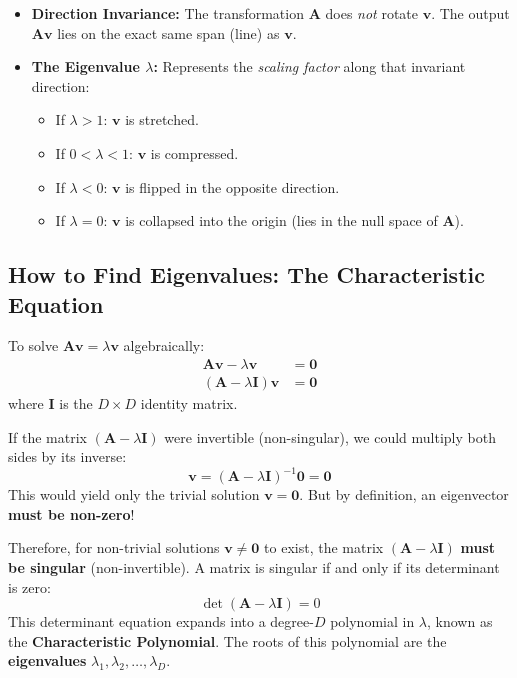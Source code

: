 \documentclass[11pt, a4paper]{article}
\begin{document}
\begin{explainbox}
\begin{itemize}[leftmargin=1.2em]
    \item \textbf{Direction Invariance:} The transformation $\mathbf{A}$ does \emph{not} rotate $\mathbf{v}$. The output $\mathbf{A}\mathbf{v}$ lies on the exact same span (line) as $\mathbf{v}$.
    \item \textbf{The Eigenvalue $\lambda$:} Represents the \emph{scaling factor} along that invariant direction:
    \begin{itemize}
        \item If $\lambda > 1$: $\mathbf{v}$ is stretched.
        \item If $0 < \lambda < 1$: $\mathbf{v}$ is compressed.
        \item If $\lambda < 0$: $\mathbf{v}$ is flipped in the opposite direction.
        \item If $\lambda = 0$: $\mathbf{v}$ is collapsed into the origin (lies in the null space of $\mathbf{A}$).
    \end{itemize}
\end{itemize}
\end{explainbox}

\subsection{How to Find Eigenvalues: The Characteristic Equation}

To solve $\mathbf{A}\mathbf{v} = \lambda \mathbf{v}$ algebraically:
\begin{align}
\mathbf{A}\mathbf{v} - \lambda \mathbf{v} &= \mathbf{0} \\[0.3em]
(\mathbf{A} - \lambda \mathbf{I})\mathbf{v} &= \mathbf{0}
\end{align}
where $\mathbf{I}$ is the $D \times D$ identity matrix.

\begin{explainbox}
If the matrix $(\mathbf{A} - \lambda \mathbf{I})$ were invertible (non-singular), we could multiply both sides by its inverse:
$$\mathbf{v} = (\mathbf{A} - \lambda \mathbf{I})^{-1} \mathbf{0} = \mathbf{0}$$
This would yield only the trivial solution $\mathbf{v} = \mathbf{0}$. But by definition, an eigenvector \textbf{must be non-zero}!

Therefore, for non-trivial solutions $\mathbf{v} \ne \mathbf{0}$ to exist, the matrix $(\mathbf{A} - \lambda \mathbf{I})$ \textbf{must be singular} (non-invertible). A matrix is singular if and only if its determinant is zero:
\begin{equation}
\det(\mathbf{A} - \lambda \mathbf{I}) = 0
\end{equation}
This determinant equation expands into a degree-$D$ polynomial in $\lambda$, known as the \textbf{Characteristic Polynomial}. The roots of this polynomial are the \textbf{eigenvalues} $\lambda_1, \lambda_2, \ldots, \lambda_D$.
\end{explainbox}
\end{document}

